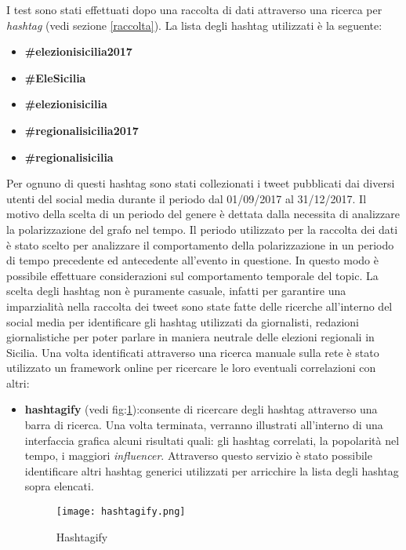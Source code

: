 I test sono stati effettuati dopo una raccolta di dati attraverso una ricerca per \textit{hashtag} (vedi sezione \ref{raccolta}). La lista degli hashtag utilizzati è la seguente:
\begin{itemize}
\item \textbf{\#elezionisicilia2017}
\item \textbf{\#EleSicilia}
\item \textbf{\#elezionisicilia}
\item \textbf{\#regionalisicilia2017}
\item \textbf{\#regionalisicilia}
\end{itemize}
Per ognuno di questi hashtag sono stati collezionati i tweet pubblicati dai diversi utenti del social media durante il periodo dal 01/09/2017 al 31/12/2017.
Il motivo della scelta di un periodo del genere è dettata dalla necessita di analizzare la polarizzazione del grafo nel tempo. Il periodo utilizzato per la raccolta dei dati è stato scelto per analizzare il comportamento della polarizzazione in un periodo di tempo precedente ed antecedente all'evento in questione. In questo modo è possibile effettuare considerazioni sul comportamento temporale del topic.
La scelta degli hashtag non è puramente casuale, infatti per garantire una imparzialità nella raccolta dei tweet sono state fatte delle ricerche all'interno del social media per identificare gli hashtag utilizzati da giornalisti, redazioni giornalistiche per poter parlare in maniera neutrale delle elezioni regionali in Sicilia.
Una volta identificati attraverso una ricerca manuale sulla rete è stato utilizzato un framework online per ricercare le loro eventuali correlazioni con altri:
\begin{itemize}
\item \textbf{hashtagify} (vedi fig:\ref{Hashtagify}):consente di ricercare degli hashtag attraverso una barra di ricerca. Una volta terminata, verranno illustrati all'interno di una interfaccia grafica alcuni risultati quali: gli hashtag correlati, la popolarità nel tempo, i maggiori \textit{influencer}.
Attraverso questo servizio è stato possibile identificare altri hashtag generici utilizzati per arricchire la lista degli hashtag sopra elencati.
\begin{figure}[!htb]
    \begin{center}
      \texttt{[image: hashtagify.png]}
	\caption{Hashtagify}
	\label{Hashtagify}
    \end{center}
  \end{figure}
  
\end{itemize}
